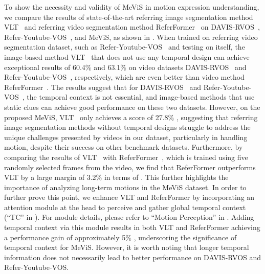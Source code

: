 \documentclass[10pt,twocolumn,letterpaper]{article}
\newcommand{\ourdataset}{MeViS\xspace}
\begin{document}
To show the necessity and validity of \ourdataset in motion expression understanding, we compare the results of state-of-the-art referring image segmentation method VLT~\cite{vltpami} and referring video segmentation method ReferFormer~\cite{wu2022referformer} on DAVIS-RVOS~\cite{khoreva2018video}, Refer-Youtube-VOS~\cite{seo2020urvos}, and \ourdataset, as shown in . When trained on referring video segmentation dataset, such as Refer-Youtube-VOS~\cite{seo2020urvos} and testing on itself, the image-based method VLT~\cite{vltpami} that does not use any temporal design can achieve exceptional results of 60.4\%  and 63.1\%  on video datasets DAVIS-RVOS~\cite{khoreva2018video} and Refer-Youtube-VOS~\cite{seo2020urvos}, respectively, which are even better than video method ReferFormer~\cite{wu2022referformer}. The results suggest that for DAVIS-RVOS~\cite{khoreva2018video} and Refer-Youtube-VOS~\cite{seo2020urvos}, the temporal context is not essential, and image-based methods that use static clues can achieve good performance on these two datasets. However, on the proposed \ourdataset, VLT~\cite{vltpami} only achieves a score of 27.8\% , suggesting that referring image segmentation methods without temporal designs struggle to address the unique challenges presented by videos in our dataset, particularly in handling motion, despite their success on other benchmark datasets. Furthermore, by comparing the results of VLT~\cite{vltpami} with ReferFormer~\cite{wu2022referformer}, which is trained using five randomly selected frames from the video, we find that ReferFormer outperforms VLT by a large margin of {3.2\%} in terms of . This further highlights the importance of analyzing long-term motions in the \ourdataset dataset. In order to further prove this point, we enhance VLT and ReferFormer by incorporating an attention module at the head to perceive and gather global temporal context (``TC'' in ). For module details, please refer to ``Motion Perception'' in . Adding temporal context via this module results in both VLT and ReferFormer achieving a performance gain of approximately 5\% , underscoring the significance of temporal context for \ourdataset. However, it is worth noting that longer temporal information does not necessarily lead to better performance on DAVIS-RVOS and Refer-Youtube-VOS.
\end{document}

